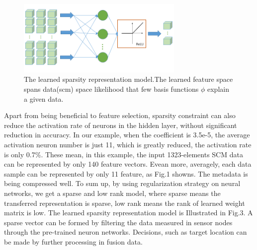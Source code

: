 

\begin{figure}
\includegraphics[width=8cm]{figure/sparse_represention_model}
\caption{The learned sparsity representation model.The learned feature space spans data(scm) space likelihood that few basis functions $\phi$ explain a given data.}
\end{figure}

Apart from being beneficial to feature selection, sparsity constraint can also reduce the activation rate of neurons in the hidden layer, without significant reduction in accuracy. In our example, when the coefficient is 3.5e-5, the average activation neuron number is just 11, which is greatly reduced, the activation rate is only 0.7{\%}.
These mean, in this example, the input 1323-elements SCM  data can be represented by only 140 feature vectors. Evean more, averagely, each data sample can be represented by only 11 feature, as Fig.1 showns. The metadata is being compressed well. To sum up, by using regularization strategy on neural networks, we get a sparse and low rank model, where sparse means the transferred representation is sparse, low rank means the rank of learned weight matrix is low. The learned sparsity representation model is Illustrated in Fig.3.
A sparse vector can be formed by filtering the data measured in sensor nodes through the pre-trained neuron networks. Decisions, such as target location can be made by further processing in fusion data.

